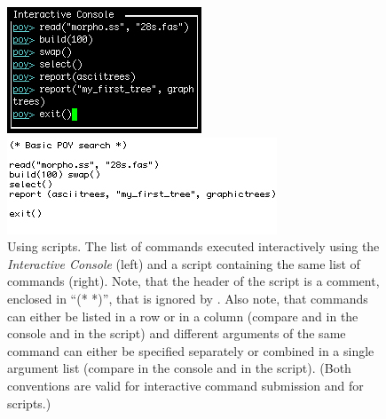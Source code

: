 \begin{figure}
\centering
\begin{minipage}[c]{0.42\textwidth}
   		\includegraphics[width=\textwidth]{figures/commandlist.jpg}
\end{minipage}
\quad
\begin{minipage}[c]{0.53\textwidth}
	   	\includegraphics[width=\textwidth]{figures/script.jpg}
   	\end{minipage}
\caption{Using \poy scripts. The list of commands executed interactively using the \emph{Interactive Console} (left) and a script containing the same list of commands (right). Note, that the header of the script is a comment, enclosed in ``(* *)'', that is ignored by \poy. Also note, that commands can either be listed in a row or in a column (compare  and  in the console and in the script) and different arguments of the same command can either be specified separately or combined in a single argument list (compare  in the console and in the script). (Both conventions are valid for interactive command submission and for scripts.)}
\label{fig:script}
\end{figure}

